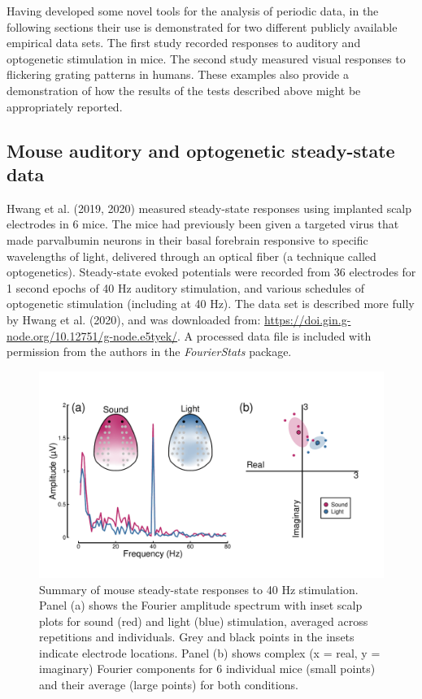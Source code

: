 \documentclass[]{article}
\begin{document}
Having developed some novel tools for the analysis of periodic data, in the following sections their use is demonstrated for two different publicly available empirical data sets. The first study recorded responses to auditory and optogenetic stimulation in mice. The second study measured visual responses to flickering grating patterns in humans. These examples also provide a demonstration of how the results of the tests described above might be appropriately reported.

\hypertarget{mouse-auditory-and-optogenetic-steady-state-data}{%
\subsection{Mouse auditory and optogenetic steady-state data}\label{mouse-auditory-and-optogenetic-steady-state-data}}

Hwang et al. (2019, 2020) measured steady-state responses using implanted scalp electrodes in 6 mice. The mice had previously been given a targeted virus that made parvalbumin neurons in their basal forebrain responsive to specific wavelengths of light, delivered through an optical fiber (a technique called optogenetics). Steady-state evoked potentials were recorded from 36 electrodes for 1 second epochs of 40 Hz auditory stimulation, and various schedules of optogenetic stimulation (including at 40 Hz). The data set is described more fully by Hwang et al. (2020), and was downloaded from: \url{https://doi.gin.g-node.org/10.12751/g-node.e5tyek/}. A processed data file is included with permission from the authors in the \emph{FourierStats} package.

\begin{figure}

{\centering \includegraphics{figures/mousedata} 

}

\caption{Summary of mouse steady-state responses to 40 Hz stimulation. Panel (a) shows the Fourier amplitude spectrum with inset scalp plots for sound (red) and light (blue) stimulation, averaged across repetitions and individuals. Grey and black points in the insets indicate electrode locations. Panel (b) shows complex (x = real, y = imaginary) Fourier components for 6 individual mice (small points) and their average (large points) for both conditions.}\label{fig:mousedata}
\end{figure}
\end{document}
